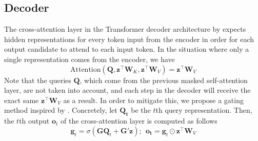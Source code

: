 \subsection{Decoder}

The %
cross-attention layer in the Transformer decoder architecture by \citet{vaswani17}  expects hidden representations for every token input from the encoder in order for each output candidate to attend to each input token. In the situation where only a single representation comes from the encoder, we have
\begin{equation}
    \text{Attention}(\mathbf{Q}, \mathbf{z}^\top \mathbf{W}_K, \mathbf{z}^\top \mathbf{W}_V) = \mathbf{z}^\top \mathbf{W}_V
\end{equation}
Note that the queries $\mathbf{Q}$, which come from the previous masked self-attention layer, are not  taken into account, and each step in the decoder will receive the exact same $\mathbf{z}^\top \mathbf{W}_V$ as a result.  In order to mitigate this, we propose a gating method inspired by \citet{hochreiter1997long}. %
Concretely, let $\mathbf{Q_t}$ be the $t$th query representation. Then, the $t$th output $\mathbf{o}_t$ of the %
cross-attention layer is computed as follows 
\begin{equation}
    \mathbf{g}_t = \sigma(\mathbf{G}  \mathbf{Q}_t + \mathbf{G'}  \mathbf{z});\ \  
        \mathbf{o_t} = \mathbf{g}_t \odot \mathbf{z}^\top\mathbf{W}_V
\end{equation}
